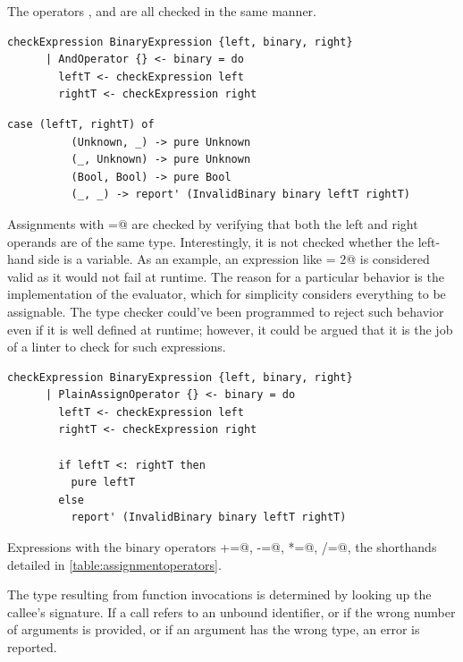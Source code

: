 \documentclass[UdineBachThesis,american,11pt]{PhdThesis}
\begin{document}
  The operators \lstinline@and@, \lstinline@or@ and \lstinline@xor@ are all
  checked in the same manner.

  \begin{lstlisting}[gobble=4,basicstyle=\ttfamily\small]
    checkExpression BinaryExpression {left, binary, right}
      | AndOperator {} <- binary = do
        leftT <- checkExpression left
        rightT <- checkExpression right
  \end{lstlisting}

  \newpage

  \begin{lstlisting}[gobble=4,basicstyle=\ttfamily\small]
        case (leftT, rightT) of
          (Unknown, _) -> pure Unknown
          (_, Unknown) -> pure Unknown
          (Bool, Bool) -> pure Bool
          (_, _) -> report' (InvalidBinary binary leftT rightT)
  \end{lstlisting}

  Assignments with \lstinline@=@ are checked by verifying that both the left and
  right operands are of the same type. Interestingly, it is not checked whether
  the left-hand side is a variable. As an example, an expression like
   = 2@ is considered valid as it would not fail at runtime. The
  reason for a particular behavior is the implementation of the evaluator, which
  for simplicity considers everything to be assignable. The type checker
  could've been programmed to reject such behavior even if it is well defined at
  runtime; however, it could be argued that it is the job of a linter to check
  for such expressions.

  \begin{lstlisting}[gobble=4,basicstyle=\ttfamily\small]
    checkExpression BinaryExpression {left, binary, right}
      | PlainAssignOperator {} <- binary = do
        leftT <- checkExpression left
        rightT <- checkExpression right

        if leftT <: rightT then
          pure leftT
        else
          report' (InvalidBinary binary leftT rightT)
  \end{lstlisting}

  Expressions with the binary operators \lstinline@+=@, \lstinline@-=@,
  \lstinline@*=@, \lstinline@/=@, \lstinline@%=@ are type checked considering
  the shorthands detailed in \autoref{table:assignmentoperators}.

  The type resulting from function invocations is determined by looking up the
  callee's signature. If a call refers to an unbound identifier, or if the wrong
  number of arguments is provided, or if an argument has the wrong type, an
  error is reported.
\end{document}
